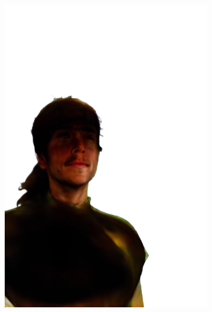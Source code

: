 \begin{figure}[ht]
\begin{subfigure}{0.08\linewidth}
        \includegraphics[width=\textwidth]{Figures/results/high/irene_cowboy/11_render.png}

\end{subfigure}
\end{figure}
